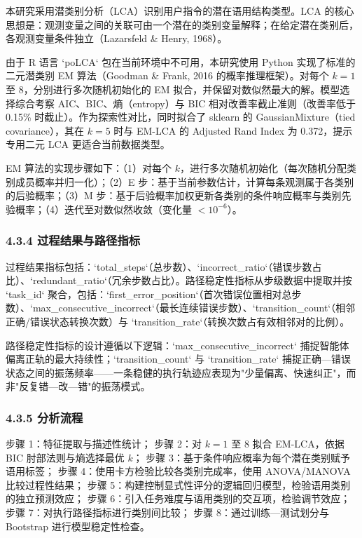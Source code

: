 \documentclass[12pt,a4paper,openany,oneside]{ctexrep}
\begin{document}
本研究采用潜类别分析（LCA）识别用户指令的潜在语用结构类型。LCA 的核心思想是：观测变量之间的关联可由一个潜在的类别变量解释；在给定潜在类别后，各观测变量条件独立（Lazarsfeld \& Henry, 1968）。

由于 R 语言 `poLCA` 包在当前环境中不可用，本研究使用 Python 实现了标准的二元潜类别 EM 算法（Goodman \& Frank, 2016 的概率推理框架）。对每个 $k=1$ 至 8，分别进行多次随机初始化的 EM 拟合，并保留对数似然最大的解。模型选择综合考察 AIC、BIC、熵（entropy）与 BIC 相对改善率截止准则（改善率低于 0.15\% 时截止）。作为探索性对比，同时拟合了 sklearn 的 GaussianMixture（tied covariance），其在 $k=5$ 时与 EM-LCA 的 Adjusted Rand Index 为 0.372，提示专用二元 LCA 更适合当前数据类型。

EM 算法的实现步骤如下：（1）对每个 $k$，进行多次随机初始化（每次随机分配类别成员概率并归一化）；（2）E 步：基于当前参数估计，计算每条观测属于各类别的后验概率；（3）M 步：基于后验概率加权更新各类别的条件响应概率与类别先验概率；（4）迭代至对数似然收敛（变化量 $< 10^{-6}$）。

\subsubsection{4.3.4 过程结果与路径指标}


过程结果指标包括：`total\_steps`（总步数）、`incorrect\_ratio`（错误步数占比）、`redundant\_ratio`（冗余步数占比）。路径稳定性指标从步级数据中提取并按 `task\_id` 聚合，包括：`first\_error\_position`（首次错误位置相对总步数）、`max\_consecutive\_incorrect`（最长连续错误步数）、`transition\_count`（相邻正确/错误状态转换次数）与 `transition\_rate`（转换次数占有效相邻对的比例）。

路径稳定性指标的设计遵循以下逻辑：`max\_consecutive\_incorrect` 捕捉智能体偏离正轨的最大持续性；`transition\_count` 与 `transition\_rate` 捕捉正确—错误状态之间的振荡频率——一条稳健的执行轨迹应表现为"少量偏离、快速纠正"，而非"反复错—改—错"的振荡模式。

\subsubsection{4.3.5 分析流程}


步骤 1：特征提取与描述性统计；
步骤 2：对 $k=1$ 至 8 拟合 EM-LCA，依据 BIC 肘部法则与熵选择最优 $k$；
步骤 3：基于条件响应概率为每个潜在类别赋予语用标签；
步骤 4：使用卡方检验比较各类别完成率，使用 ANOVA/MANOVA 比较过程性结果；
步骤 5：构建控制显式性评分的逻辑回归模型，检验语用类别的独立预测效应；
步骤 6：引入任务难度与语用类别的交互项，检验调节效应；
步骤 7：对执行路径指标进行类别间比较；
步骤 8：通过训练—测试划分与 Bootstrap 进行模型稳定性检查。
\end{document}

